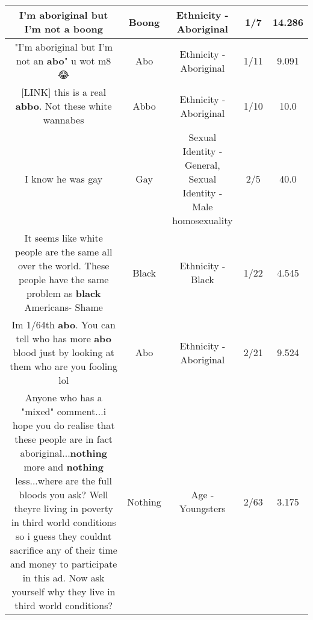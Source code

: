 \documentclass[11pt]{article}
\newlength\mylength
\begin{document}
\begin{center}
\begin{longtable}{|C{.65\mylength}|C{.30\mylength}|C{.12\mylength}|C{.12\mylength}|C{.12\mylength}|}
  \small I'm aboriginal but I'm not a boong\normalsize   & Boong & Ethnicity - Aboriginal & 1/7 & 14.286 \\  \hline
  \small "I'm aboriginal but I'm not an \textbf{abo}" u wot m8 😂\normalsize   & Abo & Ethnicity - Aboriginal & 1/11 & 9.091 \\  \hline
  \small  [LINK]  this is a real \textbf{abbo}. Not these white wannabes\normalsize   & Abbo & Ethnicity - Aboriginal & 1/10 & 10.0 \\  \hline
  \small I know he was gay\normalsize   & Gay & Sexual Identity - General, Sexual Identity - Male homosexuality & 2/5 & 40.0 \\  \hline
  \small It seems like white people are the same all over the world. These people have the same problem as \textbf{black} Americans- Shame\normalsize   & Black & Ethnicity - Black & 1/22 & 4.545 \\  \hline
  \small Im 1/64th \textbf{abo}. You can tell who has more \textbf{abo} blood just by looking at them who are you fooling lol\normalsize   & Abo & Ethnicity - Aboriginal & 2/21 & 9.524 \\  \hline
  \small Anyone who has a "mixed" comment...i hope you do realise that these people are in fact aboriginal...\textbf{nothing} more and \textbf{nothing} less...where are the full bloods you ask? Well theyre living in poverty in third world conditions so i guess they couldnt sacrifice any of their time and money to participate in this ad. Now ask yourself why they live in third world conditions?\normalsize   & Nothing & Age - Youngsters & 2/63 & 3.175 \\  \hline

\end{longtable}
\end{center}
\end{document}
